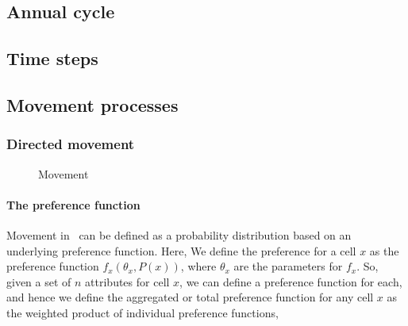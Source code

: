 \subsection{Annual cycle}

\subsection{Time steps}

\subsection{Movement processes}

\subsubsection{Directed movement}

\begin{figure}[htp]
 \caption{Movement}
 \label{fig:Movement}
\end{figure}


\paragraph{The preference function}

 Movement in \SPM\ can be defined as a probability distribution based on an underlying preference function. Here, We define the preference for a cell $x$ as the preference function $f_x(\theta_x,P(x))$, where $\theta_x$ are the parameters for $f_x$. So, given a set of $n$ attributes for cell $x$, we can define a preference function for each, and hence we define the aggregated or total preference function for any cell $x$ as the weighted product of individual preference functions,

